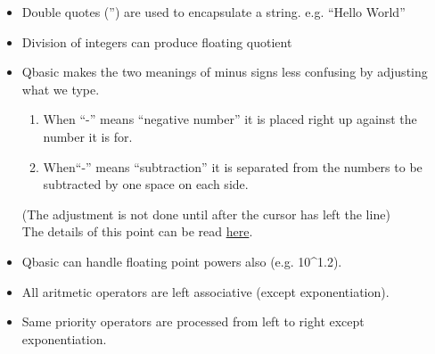 \documentclass[a4paper,11pt]{article}
\begin{document}
 \begin{itemize}
  \item Double quotes ('') are used to encapsulate a string. e.g. ``Hello World''
  
  \item Division of integers can produce floating quotient
  
  \item Qbasic makes the two meanings of minus signs less confusing by adjusting what we type.
  \begin{enumerate}
   \item When ``-'' means ``negative number'' it is placed right up against the number it is for.
   \item When``-'' means ``subtraction'' it is separated from the numbers to be subtracted by one space on each side.
  \end{enumerate}
  (The adjustment is not done until after the cursor has left the line)
  \\The details of this point can be read \href{http://chortle.ccsu.edu/QBasic/chapter01/bc01_19.html}{here}.
  
  \item Qbasic can handle floating point powers also (e.g. 10\^{}1.2).
  \item All aritmetic operators are left associative (except exponentiation).
  \item Same priority operators are processed from left to right except exponentiation.
  
 \end{itemize}
\end{document}
